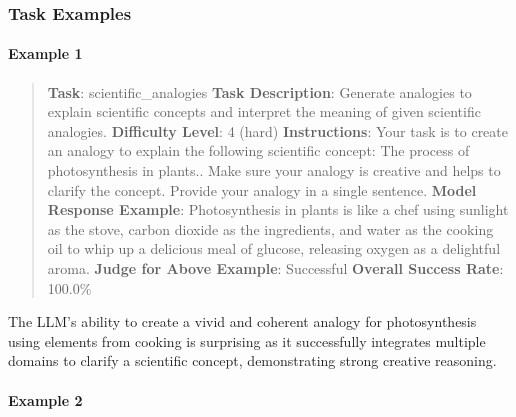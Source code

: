 \documentclass[fleqn,10pt]{wlscirep}
\begin{document}
\hypertarget{task-examples-19}{%
\subsubsection{Task Examples}\label{task-examples-19}}

\hypertarget{example-1-19}{%
\paragraph{Example 1}\label{example-1-19}}

\begin{quote}
\textbf{Task}: scientific\_analogies \textbf{Task Description}: Generate
analogies to explain scientific concepts and interpret the meaning of
given scientific analogies. \textbf{Difficulty Level}: 4 (hard)
\textbf{Instructions}: Your task is to create an analogy to explain the
following scientific concept: The process of photosynthesis in plants..
Make sure your analogy is creative and helps to clarify the concept.
Provide your analogy in a single sentence. \textbf{Model Response
Example}: Photosynthesis in plants is like a chef using sunlight as the
stove, carbon dioxide as the ingredients, and water as the cooking oil
to whip up a delicious meal of glucose, releasing oxygen as a delightful
aroma. \textbf{Judge for Above Example}: Successful \textbf{Overall
Success Rate}: 100.0\%
\end{quote}

The LLM's ability to create a vivid and coherent analogy for
photosynthesis using elements from cooking is surprising as it
successfully integrates multiple domains to clarify a scientific
concept, demonstrating strong creative reasoning.

\hypertarget{example-2-16}{%
\paragraph{Example 2}\label{example-2-16}}
\end{document}

